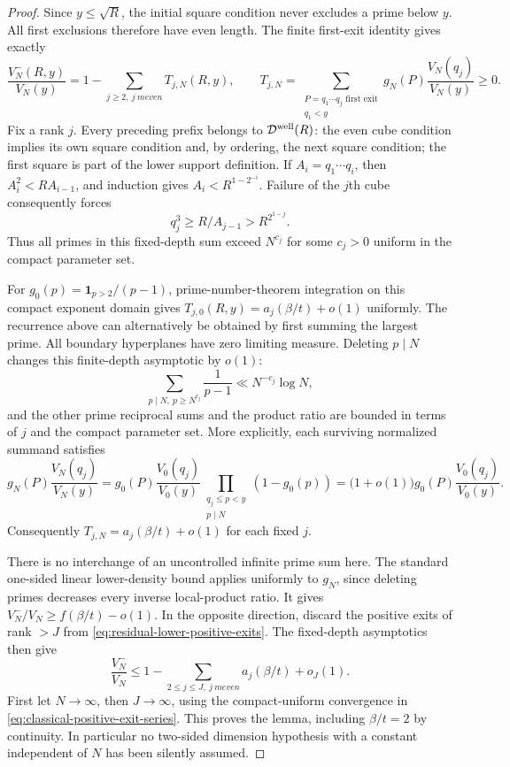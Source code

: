 \documentclass[11pt]{article}
\begin{document}
\begin{proof}
Since $y\le\sqrt R$, the initial square condition never excludes
a prime below $y$. All first exclusions therefore have even length.
The finite first-exit identity gives exactly
\begin{equation}\label{eq:residual-lower-positive-exits}
 \frac{V_N^-(R,y)}{V_N(y)}
 =1-\sum_{j\ge2,\ j\ {
m even}} T_{j,N}(R,y),\qquad
 T_{j,N}=\sum_{\substack{P=q_1\cdots q_j\text{ first exit}\\q_1<y}}
 g_N(P)\frac{V_N(q_j)}{V_N(y)}\ge0.
\end{equation}
Fix a rank $j$. Every preceding prefix belongs to
$\mathcal D^{\rm well}(R)$: the even cube condition implies its
own square condition and, by ordering, the next square condition;
the first square is part of the lower support definition.
If $A_i=q_1\cdots q_i$, then $A_i^2<R A_{i-1}$, and induction gives
$A_i<R^{1-2^{-i}}$. Failure of the $j$th cube consequently forces
\[
 q_j^3\ge R/A_{j-1}>R^{2^{1-j}}.
\]
Thus all primes in this fixed-depth sum exceed $N^{c_j}$ for some
$c_j>0$ uniform in the compact parameter set.

For $g_0(p)=\mathbf1_{p>2}/(p-1)$, prime-number-theorem integration
on this compact exponent domain gives
$T_{j,0}(R,y)=a_j(\beta/t)+o(1)$ uniformly. The recurrence above
can alternatively be obtained by first summing the largest prime.
All boundary hyperplanes have zero limiting measure.
Deleting $p\mid N$ changes this finite-depth asymptotic by $o(1)$:
\[
 \sum_{p\mid N,\ p\ge N^{c_j}}\frac1{p-1}
 \ll N^{-c_j}\log N,
\]
and the other prime reciprocal sums and the product ratio are bounded
in terms of $j$ and the compact parameter set. More explicitly, each
surviving normalized summand satisfies
\[
 g_N(P)\frac{V_N(q_j)}{V_N(y)}
 =g_0(P)\frac{V_0(q_j)}{V_0(y)}
   \prod_{\substack{q_j\le p<y\\p\mid N}}(1-g_0(p))
 =\bigl(1+o(1)\bigr)
   g_0(P)\frac{V_0(q_j)}{V_0(y)}.
\]
Consequently $T_{j,N}=a_j(\beta/t)+o(1)$ for each fixed $j$.

There is no interchange of an uncontrolled infinite prime sum here.
The standard one-sided linear lower-density bound applies uniformly
to $g_N$, since deleting primes decreases every inverse local-product
ratio. It gives $V_N^-/V_N\ge f(\beta/t)-o(1)$.
In the opposite direction, discard the positive exits of rank $>J$
from \eqref{eq:residual-lower-positive-exits}. The fixed-depth
asymptotics then give
\[
 \frac{V_N^-}{V_N}\le
 1-\sum_{2\le j\le J,\ j\ {
m even}}a_j(\beta/t)+o_J(1).
\]
First let $N\to\infty$, then $J\to\infty$, using the compact-uniform
convergence in \eqref{eq:classical-positive-exit-series}. This proves
the lemma, including $\beta/t=2$ by continuity. In particular no
two-sided dimension hypothesis with a constant independent of $N$
has been silently assumed.
\end{proof}
\end{document}
